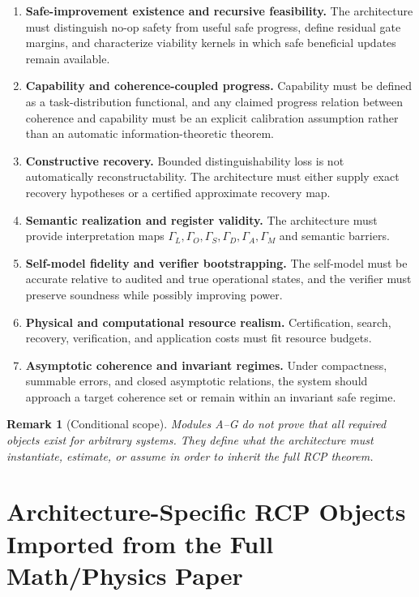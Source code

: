 \documentclass[11pt,a4paper]{article}
\newtheorem{remark}[theorem]{Remark}
\begin{document}
\begin{enumerate}[label=\textbf{Module \Alph*.}, leftmargin=2.2em]
    \item \textbf{Safe-improvement existence and recursive feasibility.} The architecture must distinguish no-op safety from useful safe progress, define residual gate margins, and characterize viability kernels in which safe beneficial updates remain available.
    \item \textbf{Capability and coherence-coupled progress.} Capability must be defined as a task-distribution functional, and any claimed progress relation between coherence and capability must be an explicit calibration assumption rather than an automatic information-theoretic theorem.
    \item \textbf{Constructive recovery.} Bounded distinguishability loss is not automatically reconstructability. The architecture must either supply exact recovery hypotheses or a certified approximate recovery map.
    \item \textbf{Semantic realization and register validity.} The architecture must provide interpretation maps \(\Gamma_L,\Gamma_O,\Gamma_S,\Gamma_D,\Gamma_A,\Gamma_M\) and semantic barriers.
    \item \textbf{Self-model fidelity and verifier bootstrapping.} The self-model must be accurate relative to audited and true operational states, and the verifier must preserve soundness while possibly improving power.
    \item \textbf{Physical and computational resource realism.} Certification, search, recovery, verification, and application costs must fit resource budgets.
    \item \textbf{Asymptotic coherence and invariant regimes.} Under compactness, summable errors, and closed asymptotic relations, the system should approach a target coherence set or remain within an invariant safe regime.
\end{enumerate}

\begin{remark}[Conditional scope]
Modules A--G do not prove that all required objects exist for arbitrary systems. They define what the architecture must instantiate, estimate, or assume in order to inherit the full RCP theorem.
\end{remark}


\section{Architecture-Specific RCP Objects Imported from the Full Math/Physics Paper}
\label{sec:rcp_objects_imported_architecture}
\end{document}
